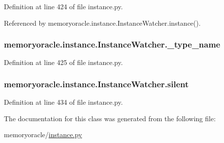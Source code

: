 Definition at line 424 of file instance.\+py.



Referenced by memoryoracle.\+instance.\+Instance\+Watcher.\+instance().

\hypertarget{classmemoryoracle_1_1instance_1_1InstanceWatcher_aab7d06a6fb4e5029e13fa851b57bb7a6}{}
\subsubsection[{\+\_\+type\+\_\+name}]{\setlength{\rightskip}{0pt plus 5cm}memoryoracle.\+instance.\+Instance\+Watcher.\+\_\+type\+\_\+name\hspace{0.3cm}{\ttfamily [private]}}\label{classmemoryoracle_1_1instance_1_1InstanceWatcher_aab7d06a6fb4e5029e13fa851b57bb7a6}


Definition at line 425 of file instance.\+py.

\hypertarget{classmemoryoracle_1_1instance_1_1InstanceWatcher_a483405128108db3465d423107be47589}{}
\subsubsection[{silent}]{\setlength{\rightskip}{0pt plus 5cm}memoryoracle.\+instance.\+Instance\+Watcher.\+silent}\label{classmemoryoracle_1_1instance_1_1InstanceWatcher_a483405128108db3465d423107be47589}


Definition at line 434 of file instance.\+py.



The documentation for this class was generated from the following file\+:\begin{DoxyCompactItemize}
\item 
memoryoracle/\hyperlink{instance_8py}{instance.\+py}\end{DoxyCompactItemize}
